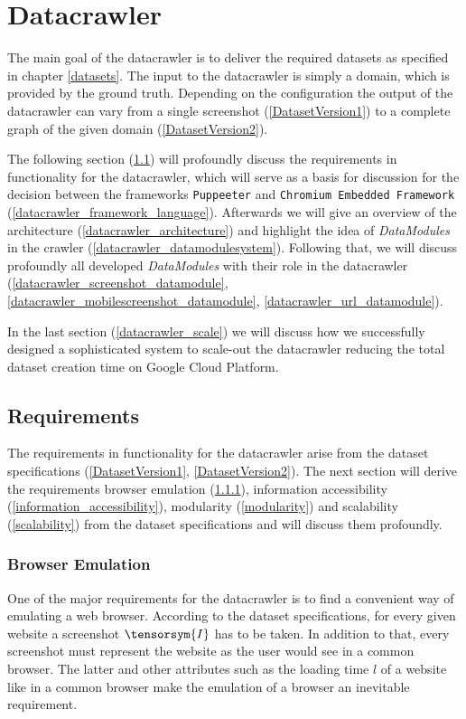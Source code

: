 \section{Datacrawler}
\label{Datacrawler}
The main goal of the datacrawler is to deliver the required datasets as specified in chapter \ref{datasets}. The input to the datacrawler is simply a domain, which is provided by the ground truth. Depending on the configuration the output of the datacrawler can vary from a single screenshot (\ref{DatasetVersion1}) to a complete graph of the given domain (\ref{DatasetVersion2}).

The following section (\ref{datacrawler_requirements}) will profoundly discuss the requirements in functionality for the datacrawler, which will serve as a basis for discussion for the decision between the frameworks \texttt{Puppeeter} and \texttt{Chromium Embedded Framework} (\ref{datacrawler_framework_language}). Afterwards we will give an overview of the architecture (\ref{datacrawler_architecture}) and highlight the idea of \textit{DataModules} in the crawler (\ref{datacrawler_datamodulesystem}). Following that, we will discuss profoundly all developed \textit{DataModules} with their role in the datacrawler (\ref{datacrawler_screenshot_datamodule}, \ref{datacrawler_mobilescreenshot_datamodule}, \ref{datacrawler_url_datamodule}).

In the last section (\ref{datacrawler_scale}) we will discuss how we successfully designed a sophisticated system to scale-out the datacrawler reducing the total dataset creation time on Google Cloud Platform.  

\subsection{Requirements}
\label{datacrawler_requirements}
The requirements in functionality for the datacrawler arise from the dataset specifications (\ref{DatasetVersion1}, \ref{DatasetVersion2}). The next section will derive the requirements browser emulation (\ref{browser_emulation}), information accessibility (\ref{information_accessibility}), modularity (\ref{modularity}) and  scalability (\ref{scalability}) from the dataset specifications and will discuss them profoundly.

\subsubsection{Browser Emulation}
\label{browser_emulation}
One of the major requirements for the datacrawler is to find a convenient way of emulating a web browser. According to the dataset specifications, for every given website a screenshot $\tensorsym{I}$ has to be taken. In addition to that, every screenshot must represent the website as the user would see in a common browser. The latter and other attributes such as the loading time $l$ of a website like in a common browser make the emulation of a browser an inevitable requirement. 


